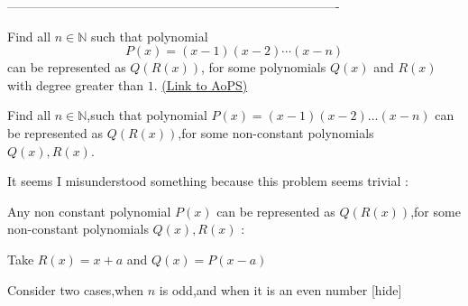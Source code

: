 -------------------------------------------------------------------------------

\begin{problem}
	Find all $ n\in\mathbb{N}$ such that polynomial
\[ P(x) = (x - 1)(x - 2) \cdots (x -n)\]
can be represented as $Q(R(x))$, for some polynomials $ Q(x)$ and $R(x)$ with degree greater than $1$.
	\flushright \href{https://artofproblemsolving.com/community/c6h183353}{(Link to AoPS)}
\end{problem}



\begin{solution}
	\begin{tcolorbox}Find all $ n\in\mathbb{N}$,such that polynomial
$ P(x) = (x - 1)(x - 2)\dots (x - n)$
can be represented as $ Q(R(x))$,for some non-constant polynomials $ Q(x),R(x)$.\end{tcolorbox}

It seems I misunderstood something because this problem seems trivial :

Any non constant polynomial $ P(x)$ can be represented as $ Q(R(x))$,for some non-constant polynomials $ Q(x),R(x)$ :

Take $ R(x)=x+a$ and $ Q(x)=P(x-a)$
\end{solution}






\begin{solution}
Consider two cases,when $ n$ is odd,and when it is an even number  
[\/hide]
\end{solution}



